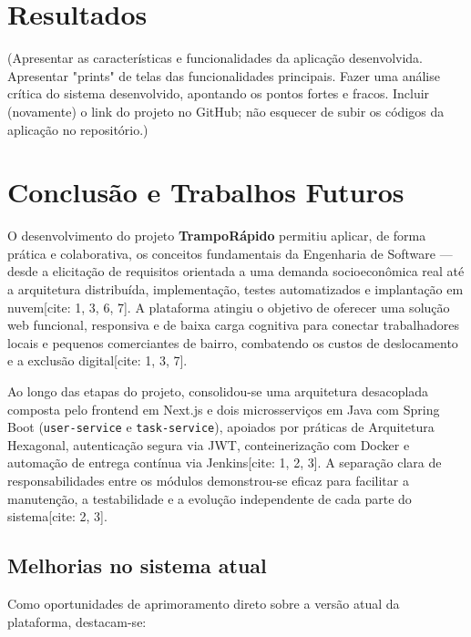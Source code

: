 \documentclass[
    12pt,
    oneside,
    a4paper,
    brazil
]{abntex2}
\begin{document}

\chapter{Resultados}

(Apresentar as características e funcionalidades da aplicação
desenvolvida. Apresentar "prints" de telas das funcionalidades principais. Fazer
uma análise crítica do sistema desenvolvido, apontando os pontos fortes e fracos.
Incluir (novamente) o link do projeto no GitHub; não esquecer de subir os códigos
da aplicação no repositório.)


\chapter{Conclusão e Trabalhos Futuros}

O desenvolvimento do projeto \textbf{TrampoRápido} permitiu aplicar, de forma prática e colaborativa, os conceitos fundamentais da Engenharia de Software — desde a elicitação de requisitos orientada a uma demanda socioeconômica real até a arquitetura distribuída, implementação, testes automatizados e implantação em nuvem[cite: 1, 3, 6, 7]. A plataforma atingiu o objetivo de oferecer uma solução web funcional, responsiva e de baixa carga cognitiva para conectar trabalhadores locais e pequenos comerciantes de bairro, combatendo os custos de deslocamento e a exclusão digital[cite: 1, 3, 7].

Ao longo das etapas do projeto, consolidou-se uma arquitetura desacoplada composta pelo frontend em Next.js e dois microsserviços em Java com Spring Boot (\texttt{user-service} e \texttt{task-service}), apoiados por práticas de Arquitetura Hexagonal, autenticação segura via JWT, conteinerização com Docker e automação de entrega contínua via Jenkins[cite: 1, 2, 3]. A separação clara de responsabilidades entre os módulos demonstrou-se eficaz para facilitar a manutenção, a testabilidade e a evolução independente de cada parte do sistema[cite: 2, 3].

\section{Melhorias no sistema atual}

Como oportunidades de aprimoramento direto sobre a versão atual da plataforma, destacam-se:
\end{document}
